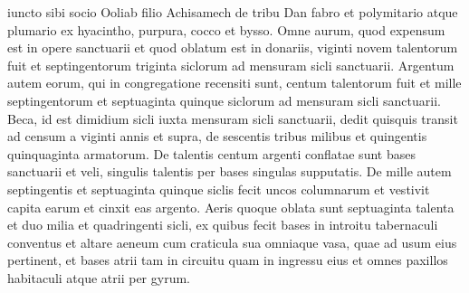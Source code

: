 \begin{biblechapter}
\verse iuncto sibi socio Ooliab filio Achisamech de tribu Dan fabro et polymitario atque plumario ex hyacintho, purpura, cocco et bysso. 
\verse Omne aurum, quod expensum est in opere sanctuarii et quod oblatum est in donariis, viginti novem talentorum fuit et septingentorum triginta siclorum ad mensuram sicli sanctuarii. 
\verse Argentum autem eorum, qui in congregatione recensiti sunt, centum talentorum fuit et mille septingentorum et septuaginta quinque siclorum ad mensuram sicli sanctuarii. 
\verse Beca, id est dimidium sicli iuxta mensuram sicli sanctuarii, dedit quisquis transit ad censum a viginti annis et supra, de sescentis tribus milibus et quingentis quinquaginta armatorum. 
\verse De talentis centum argenti conflatae sunt bases sanctuarii et veli, singulis talentis per bases singulas supputatis. 
\verse De mille autem septingentis et septuaginta quinque siclis fecit uncos columnarum et vestivit capita earum et cinxit eas argento. 
\verse Aeris quoque oblata sunt septuaginta talenta et duo milia et quadringenti sicli, 
\verse ex quibus fecit bases in introitu tabernaculi conventus et altare aeneum cum craticula sua omniaque vasa, quae ad usum eius pertinent, 
\verse et bases atrii tam in circuitu quam in ingressu eius et omnes paxillos habitaculi atque atrii per gyrum. 
\end{biblechapter}

